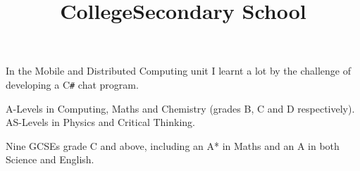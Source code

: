 \documentclass[line,margin]{res}
\newcommand{\CSharp}{C\texttt{\#}}
\begin{document}
\begin{resume}
\begin{position}
In the Mobile and Distributed Computing unit I learnt a lot by the challenge of
developing a {\CSharp} chat program.
\end{position}

\title{College}
\begin{position}
A-Levels in Computing, Maths and Chemistry (grades B, C and D respectively). \\
AS-Levels in Physics and Critical Thinking.

\end{position}

\title{Secondary School}
\begin{position}
Nine GCSEs grade C and above,
including an A* in Maths and an A in both Science and English.

\end{position}


\end{resume}
\end{document}
